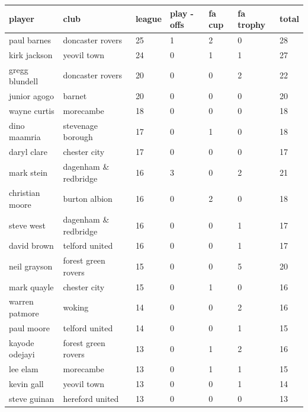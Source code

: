 \documentclass{article}
\begin{document}
\begin{tabular}{lllllll}
\toprule
player & club & league & play - offs & fa cup & fa trophy & total \\
\midrule
paul barnes & doncaster rovers & 25 & 1 & 2 & 0 & 28 \\
kirk jackson & yeovil town & 24 & 0 & 1 & 1 & 27 \\
gregg blundell & doncaster rovers & 20 & 0 & 0 & 2 & 22 \\
junior agogo & barnet & 20 & 0 & 0 & 0 & 20 \\
wayne curtis & morecambe & 18 & 0 & 0 & 0 & 18 \\
dino maamria & stevenage borough & 17 & 0 & 1 & 0 & 18 \\
daryl clare & chester city & 17 & 0 & 0 & 0 & 17 \\
mark stein & dagenham \& redbridge & 16 & 3 & 0 & 2 & 21 \\
christian moore & burton albion & 16 & 0 & 2 & 0 & 18 \\
steve west & dagenham \& redbridge & 16 & 0 & 0 & 1 & 17 \\
david brown & telford united & 16 & 0 & 0 & 1 & 17 \\
neil grayson & forest green rovers & 15 & 0 & 0 & 5 & 20 \\
mark quayle & chester city & 15 & 0 & 1 & 0 & 16 \\
warren patmore & woking & 14 & 0 & 0 & 2 & 16 \\
paul moore & telford united & 14 & 0 & 0 & 1 & 15 \\
kayode odejayi & forest green rovers & 13 & 0 & 1 & 2 & 16 \\
lee elam & morecambe & 13 & 0 & 1 & 1 & 15 \\
kevin gall & yeovil town & 13 & 0 & 0 & 1 & 14 \\
steve guinan & hereford united & 13 & 0 & 0 & 0 & 13 \\
\bottomrule
\end{tabular}
\end{document}
